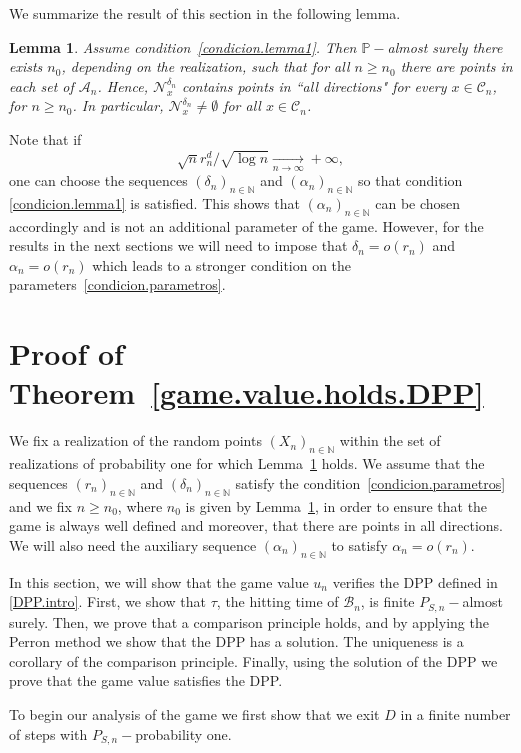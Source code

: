 \documentclass[11pt]{amsart}
\newtheorem{lemma}{Lemma}
\theoremstyle{definition}
\theoremstyle{remark}
\numberwithin{equation}{section}
\newcommand{\N}{{\mathbb N}}
\renewcommand{\P}{\mathbb{P}}
\newcommand{\B}{\mathcal{B}}
\newcommand{\C}{{\mathcal C}}
\newcommand{\Nc}{{\mathcal N}}
\begin{document}
We summarize the result of this section in the following lemma.

\begin{lemma}
\label{lemma-todas-las-dir}
Assume condition~\eqref{condicion.lemma1}.
Then $\P-$almost surely there exists $n_0$, depending on the realization, such that for all $n \ge n_0$ there are points in each set of $\mathcal{A}_n$. 
Hence, $\Nc_x^{\delta_n}$ contains points in ``all directions" for every $x \in \C_n$, for $n\ge n_0$. 
In particular, $\Nc_x^{\delta_n} \neq \emptyset$ for all $x \in \C_n$.
\end{lemma}


Note that if 
\[
\sqrt{n} r_n^d / \sqrt{\log n} \xrightarrow[n\to\infty]{} +\infty,
\]
one can choose the sequences $(\delta_n)_{n\in\N}$ and $(\alpha_n)_{n\in\N}$ so that condition \eqref{condicion.lemma1} is satisfied. This shows that $(\alpha_n)_{n\in\N}$ can be chosen accordingly and is not an additional parameter of the game.
However, for the results in the next sections we will need to impose that $\delta_n =o(r_n)$ and $\alpha_n = o(r_n)$ which leads to a stronger condition on the parameters~\eqref{condicion.parametros}.

\section{Proof of Theorem~\ref{game.value.holds.DPP}}

We fix a realization of the random points $(X_n)_{n\in\N}$ within the set of realizations of probability one for which Lemma~\ref{lemma-todas-las-dir} holds.
We assume that the sequences $(r_n)_{n\in \N}$ and $(\delta_n)_{n\in \N}$ satisfy the condition~\eqref{condicion.parametros} and we fix $n\geq n_0$, where $n_0$ is given by Lemma~\ref{lemma-todas-las-dir}, in order to ensure that the game is always well defined and moreover, that there are points in all directions. We will also need the auxiliary sequence $(\alpha_n)_{n\in\N}$ to satisfy $\alpha_n=o(r_n)$.  

In this section, we will show that the game value $u_n$ verifies the DPP defined in \eqref{DPP.intro}.
First, we show that $\tau$, the hitting time of $\B_n$, is finite $P_{S,n}-$almost surely.
Then, we prove that a comparison principle holds, and by applying the Perron method we show that the DPP has a solution.
The uniqueness is a corollary of the comparison principle.
Finally, using the solution of the DPP we prove that the game value satisfies the DPP.


To begin our analysis of the game we first show that we exit $D$ in a finite
number of steps with $P_{S,n}-$probability one.
\end{document}
